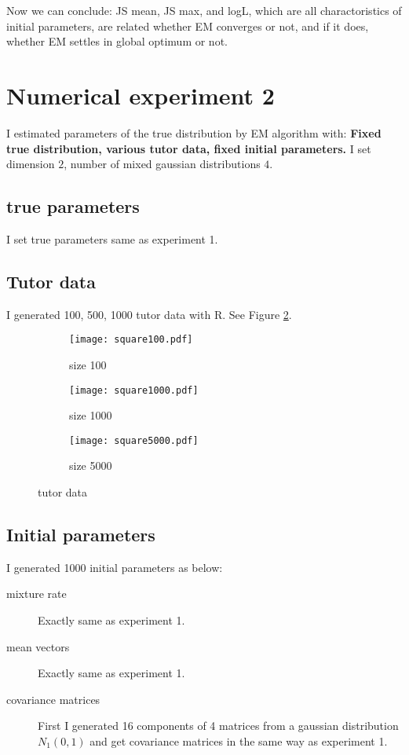 \documentclass[uplatex]{jsarticle}
\begin{document}
      \par
      \indent
	Now we can conclude: JS mean, JS max, and logL, which are all charactoristics of initial parameters, are related whether EM converges or not, and if it does, whether EM settles in global optimum or not.
      \par
%
  \section{Numerical experiment 2}
    \indent
      I estimated parameters of the true distribution by EM algorithm with: \textbf{Fixed true distribution, various tutor data, fixed initial parameters.} I set dimension $2$, number of mixed gaussian distributions $4$.
    \par
    \subsection{true parameters}
      \indent
	I set true parameters same as experiment 1.
      \par
    \subsection{Tutor data}
      \indent
	I generated 100, 500, 1000 tutor data with R. See Figure \ref{fig:square1000}.
	\begin{figure}[h]
	\centering
	  \begin{subfigure}{0.32\columnwidth}
	  \centering
	  \texttt{[image: square100.pdf]}
	  \caption{size 100}
	  \label{fig:square100}
	  \end{subfigure}
	  \begin{subfigure}{0.32\columnwidth}
	  \centering
	  \texttt{[image: square1000.pdf]}
	  \caption{size 1000}
	  \label{fig:square1000}
	  \end{subfigure}
	  \begin{subfigure}{0.32\columnwidth}
	  \centering
	  \texttt{[image: square5000.pdf]}
	  \caption{size 5000}
	  \label{fig:square5000}
	  \end{subfigure}
	\caption{tutor data}
	\label{fig:condi}
	\end{figure}
      \par
    \subsection{Initial parameters}
      \indent
	I generated 1000 initial parameters as below:
	\begin{description}
	  \item[mixture rate] Exactly same as experiment 1.
	  \item[mean vectors] Exactly same as experiment 1.
	  \item[covariance matrices] First I generated 16 components of 4 matrices from a gaussian distribution $N_1(0,1)$ and get covariance matrices in the same way as experiment 1.
	\end{description}
      \par
\end{document}

